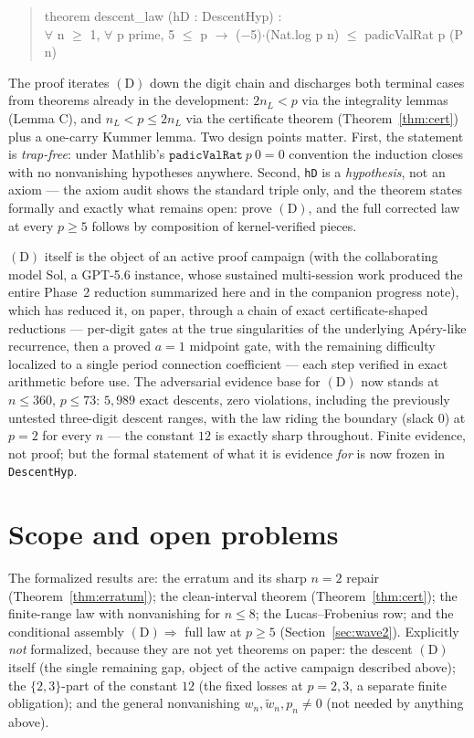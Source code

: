 \documentclass[11pt]{article}
\theoremstyle{definition}
\newcommand{\wtd}{\widetilde}
\newcommand{\lean}[1]{\texttt{#1}}
\begin{document}
\begin{quote}\small\ttfamily
theorem descent\_law (hD : DescentHyp) :\\
\hspace*{1em}$\forall$ n $\ge$ 1, $\forall$ p prime, 5 $\le$ p $\to$
($-$5)$\cdot$(Nat.log p n) $\le$ padicValRat p (P n)
\end{quote}

\noindent
The proof iterates $(\mathrm D)$ down the digit chain and discharges both
terminal cases from theorems already in the development: $2n_L < p$ via the
integrality lemmas (Lemma C), and $n_L < p \le 2n_L$ via the certificate
theorem (Theorem~\ref{thm:cert}) plus a one-carry Kummer lemma. Two design
points matter. First, the statement is \emph{trap-free}: under Mathlib's
$\lean{padicValRat}\ p\ 0 = 0$ convention the induction closes with no
nonvanishing hypotheses anywhere. Second, \lean{hD} is a \emph{hypothesis},
not an axiom --- the axiom audit shows the standard triple only, and the
theorem states formally and exactly what remains open: prove $(\mathrm D)$,
and the full corrected law at every $p \ge 5$ follows by composition of
kernel-verified pieces.

$(\mathrm D)$ itself is the object of an active proof campaign (with the
collaborating model Sol, a GPT-5.6 instance, whose sustained multi-session
work produced the entire Phase~2 reduction summarized here and in the
companion progress note), which has reduced it, on paper, through a chain of
exact certificate-shaped reductions --- per-digit gates at the true
singularities of the underlying Ap\'ery-like recurrence, then a proved $a=1$
midpoint gate, with the remaining difficulty localized to a single period
connection coefficient --- each step verified in exact arithmetic before use. The adversarial evidence base for
$(\mathrm D)$ now stands at $n \le 360$, $p \le 73$: $5{,}989$ exact
descents, zero violations, including the previously untested three-digit
descent ranges, with the law riding the boundary (slack $0$) at $p = 2$ for
every $n$ --- the constant $12$ is exactly sharp throughout. Finite evidence,
not proof; but the formal statement of what it is evidence \emph{for} is now
frozen in \lean{DescentHyp}.

\section{Scope and open problems}\label{sec:scope}

The formalized results are: the erratum and its sharp $n = 2$ repair
(Theorem~\ref{thm:erratum}); the clean-interval theorem
(Theorem~\ref{thm:cert}); the finite-range law with nonvanishing for
$n \le 8$; the Lucas--Frobenius row; and the conditional assembly
$(\mathrm D) \Rightarrow$ full law at $p \ge 5$
(Section~\ref{sec:wave2}). Explicitly \emph{not} formalized, because they
are not yet theorems on paper: the descent $(\mathrm D)$ itself (the single
remaining gap, object of the active campaign described above); the
$\{2,3\}$-part of the constant $12$ (the fixed losses at $p = 2, 3$, a
separate finite obligation); and the general nonvanishing
$w_n, \wtd w_n, p_n \ne 0$ (not needed by anything above).
\end{document}
